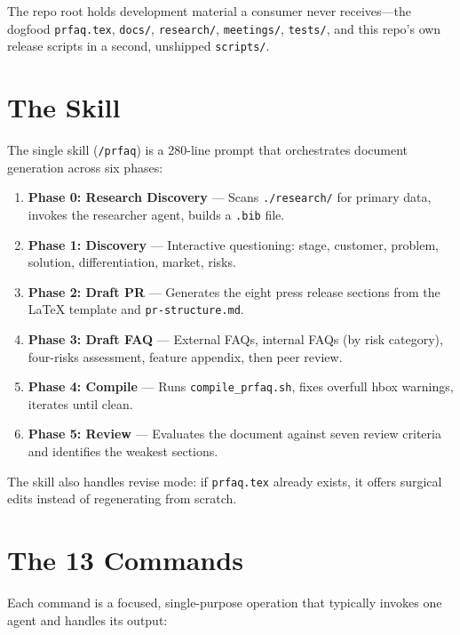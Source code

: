 \documentclass[11pt,letterpaper]{article}
\begin{document}
The repo root holds development material a consumer never receives---the
dogfood \texttt{prfaq.tex}, \texttt{docs/}, \texttt{research/},
\texttt{meetings/}, \texttt{tests/}, and this repo's own release scripts in a
second, unshipped \texttt{scripts/}.

\section{The Skill}

The single skill (\texttt{/prfaq}) is a 280-line prompt that orchestrates
document generation across six phases:

\begin{enumerate}[nosep]
  \item \textbf{Phase 0: Research Discovery} --- Scans \texttt{./research/} for
    primary data, invokes the researcher agent, builds a \texttt{.bib} file.
  \item \textbf{Phase 1: Discovery} --- Interactive questioning: stage, customer,
    problem, solution, differentiation, market, risks.
  \item \textbf{Phase 2: Draft PR} --- Generates the eight press release sections
    from the LaTeX template and \texttt{pr-structure.md}.
  \item \textbf{Phase 3: Draft FAQ} --- External FAQs, internal FAQs (by risk
    category), four-risks assessment, feature appendix, then peer review.
  \item \textbf{Phase 4: Compile} --- Runs \texttt{compile\_prfaq.sh}, fixes
    overfull hbox warnings, iterates until clean.
  \item \textbf{Phase 5: Review} --- Evaluates the document against seven review
    criteria and identifies the weakest sections.
\end{enumerate}

The skill also handles revise mode: if \texttt{prfaq.tex} already exists, it
offers surgical edits instead of regenerating from scratch.

\section{The 13 Commands}

Each command is a focused, single-purpose operation that typically invokes one
agent and handles its output:
\end{document}
